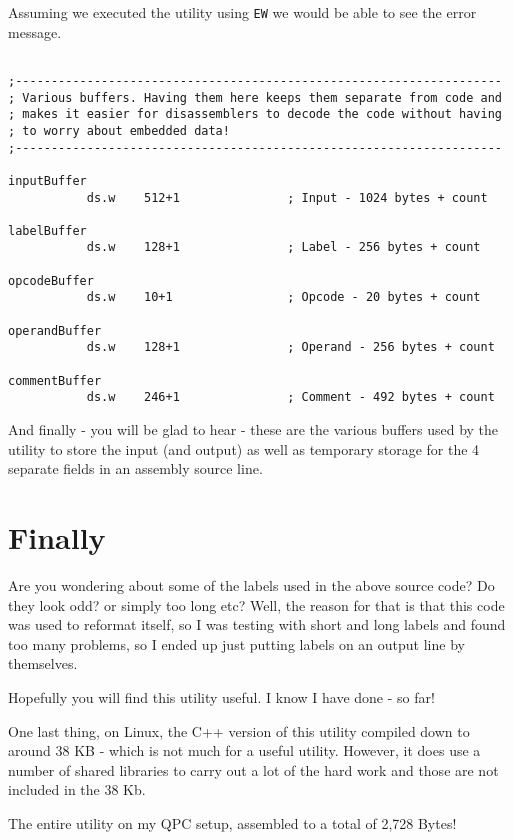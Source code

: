 Assuming we executed the utility using \texttt{EW} we would be able to see the error message.

\begin{lstlisting}[firstnumber=last,caption={ASMReformat Source - Various Buffers}]

;--------------------------------------------------------------------
; Various buffers. Having them here keeps them separate from code and
; makes it easier for disassemblers to decode the code without having
; to worry about embedded data!
;--------------------------------------------------------------------

inputBuffer
           ds.w    512+1               ; Input - 1024 bytes + count

labelBuffer
           ds.w    128+1               ; Label - 256 bytes + count

opcodeBuffer
           ds.w    10+1                ; Opcode - 20 bytes + count

operandBuffer
           ds.w    128+1               ; Operand - 256 bytes + count

commentBuffer
           ds.w    246+1               ; Comment - 492 bytes + count
\end{lstlisting}

And finally - you will be glad to hear - these are the various buffers used by the utility to store the input (and output) as well as temporary storage for the 4 separate fields in an assembly source line.

\section{Finally}

Are you wondering about some of the labels used in the above source code? Do they look odd? or simply too long etc? Well, the reason for that is that this code was used to reformat itself, so I was testing with short and long labels and found too many problems, so I ended up just putting labels on an output line by themselves.

Hopefully you will find this utility useful. I know I have done - so far!

One last thing, on Linux, the C++ version of this utility compiled down to around 38 KB - which is not much for a useful utility. However, it does use a number of shared libraries to carry out a lot of the hard work and those are not included in the 38 Kb.

The entire utility on my QPC setup, assembled to a total of 2,728 Bytes!
